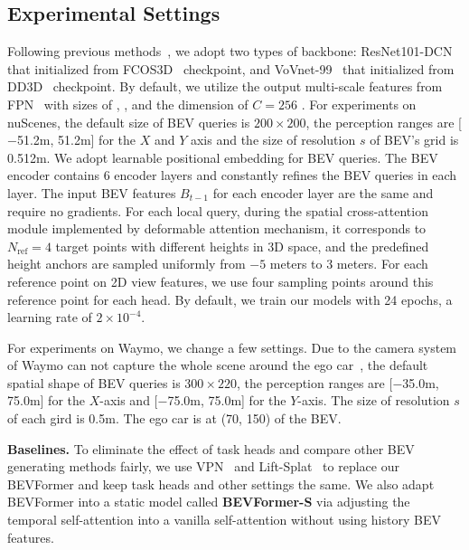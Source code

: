 \documentclass{article}
\begin{document}
\subsection{Experimental Settings}\label{details}
Following previous methods~\cite{wang2021fcos3d,wang2022detr3d,park2021pseudo}, we adopt two types of backbone: ResNet101-DCN~\cite{he2016deep,dai2017deformable} that initialized from FCOS3D~\cite{wang2021fcos3d} checkpoint, and VoVnet-99~\cite{lee2019energy} that initialized from DD3D~\cite{park2021pseudo} checkpoint. By default, we utilize the output multi-scale features from FPN~\cite{Lin2017FeaturePN} with sizes of , ,  and the dimension of $C\!=\!256$ . For experiments on nuScenes, the default size of BEV queries is $200\!\times\!200$, the perception ranges are [$-$51.2m, 51.2m] for the $X$ and $Y$ axis and the size of resolution $s$ of BEV’s grid is 0.512m. We adopt learnable positional embedding for BEV queries.
The BEV encoder contains 6 encoder layers and constantly refines the BEV queries in each layer. The input BEV features $B_{t\!-\!1}$ for each encoder layer are the same and require no gradients. For each local query, during the spatial cross-attention module implemented by deformable attention mechanism, it corresponds to ${N_\text{ref}}\!=\!4$ target points with different heights in 3D space, and the predefined height anchors are sampled uniformly from $-5$ meters to 3 meters. For each reference point on 2D view features, we use four sampling points around this reference point for each head.
By default, we train our models with 24 epochs, a learning rate of $2
\!\times\! 10^{-4}$.  


For experiments on Waymo, we change a few settings. Due to the camera system of Waymo can not capture the whole scene around the ego car~\cite{sun2020scalability}, the default spatial shape of BEV queries is $300\!\times\!220$, the perception ranges are [$-$35.0m, 75.0m] for the $X$-axis and  [$-$75.0m, 75.0m] for the $Y$-axis. The size of resolution $s$ of each gird is 0.5m. The ego car is at (70, 150) of the BEV. 

\noindent\textbf{Baselines.} To eliminate the effect of task heads and compare other BEV generating methods fairly, we use VPN~\cite{pan2020cross} and Lift-Splat~\cite{philion2020lift} to replace our BEVFormer and keep task heads and other settings the same.  We  also adapt BEVFormer into a static model called \textbf{BEVFormer-S} via adjusting the temporal self-attention into a vanilla self-attention without using history BEV features.
\end{document}
